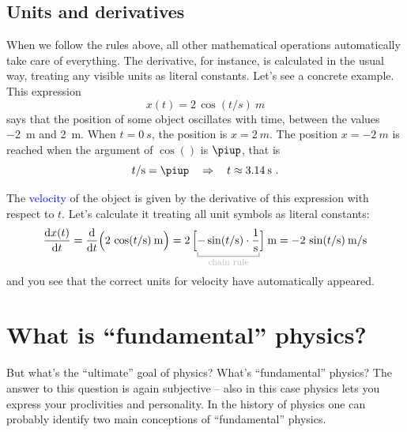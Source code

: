 \documentclass[a4paper,12pt,%
onecolumn,oneside,titlepage,%
british%
]{memoir}
\newcommand*{\pu}{\piup}%
\newcommand*{\di}{\mathrm{d}}%
\newcommand*{\limplies}{\mathbin{\Rightarrow}}%
\renewcommand*{\|}[1][]{\nonscript\:#1\vert\nonscript\:\mathopen{}}
\newcommand*{\sect}{\S}%
\newcommand*{\zerob}[1]{\makebox[0pt][c]{#1}}
\renewcommand*{\autoref}[2]{\sidepar{\vspace{-1ex}\footnotesize{\color{blue}\faIcon{%
reply%
}\enspace\sect\,\ref{#1} page\,\pageref{#1}}}\textcolor{blue}{#2}}
\begin{document}
\subsection{Units and derivatives}
\label{sec:units_derivatives}

When we follow the rules above, all other mathematical operations automatically take care of everything. The derivative, for instance, is calculated in the usual way, treating any visible units as literal constants. Let's see a concrete example. This expression
\begin{equation*}
x(t) = 2\,\cos(t/\unit{s})\:\unit{m}
\end{equation*}
says that the position of some object oscillates with time, between the values \qty{-2}{m} and \qty{+2}{m}. When $t=\qty{0}{s}$, the position is $x=\qty{+2}{m}$. The position $x=\qty{-2}{m}$ is reached when the argument of $\cos()$ is $\pu$, that is
\begin{equation*}
  t/\unit{s} = \pu \quad\limplies\quad t\approx \qty{3.14}{s} \ .
\end{equation*}

The \autoref{sec:velocity}{velocity} of the object is given by the derivative of this expression with respect to $t$. Let's calculate it treating all unit symbols as literal constants:
\begin{equation*}
  \frac{\di x(t)}{\di t} = \frac{\di}{\di t}\Bigl(
  2\,\cos(t/\unit{s})\:\unit{m}
  \Bigr)
  =
  2\,\Bigl[
  \mathcolor{grey}{\underbracket{\color{black}-\sin(t/\unit{s})\cdot\frac{1}{\unit{s}}}_{\zerob{\color{grey}\footnotesize chain rule}}}
  \Bigr]\:\unit{m}
  =
 -2\,\sin(t/\unit{s})\:\unit{m/s}
\end{equation*}
and you see that the correct units for velocity have automatically appeared.


\section{What is \enquote{fundamental} physics?}
\label{sec:fundamental_physics}

But what's the \enquote{ultimate} goal of physics? What's \enquote{fundamental} physics? The answer to this question is again subjective -- also in this case physics lets you express your proclivities and personality. In the history of physics one can probably identify two main conceptions of \enquote{fundamental} physics.
\end{document}

